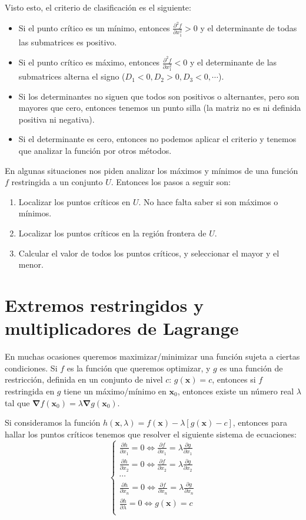 \documentclass[a4paper]{article}
\begin{document}
Visto esto, el criterio de clasificación es el siguiente:
\begin{itemize}
	\item Si el punto crítico es un mínimo, entonces $\frac{\partial^2 f}{\partial x_1^2} > 0$ y el determinante de todas las submatrices es positivo.
	\item Si el punto crítico es máximo, entonces $\frac{\partial^2 f}{\partial x_1^2} < 0$ y el determinante de las submatrices alterna el signo ($D_1 <0, D_2>0, D_3<0, \cdots$).
	\item Si los determinantes no siguen que todos son positivos o alternantes, pero son mayores que cero, entonces tenemos un punto silla (la matriz no es ni definida positiva ni negativa).
	\item Si el determinante es cero, entonces no podemos aplicar el criterio y tenemos que analizar la función por otros métodos.
\end{itemize}


En algunas situaciones nos piden analizar los máximos y mínimos de una función $f$ restringida a un conjunto $U$. Entonces los pasos a seguir son:
\begin{enumerate}
	\item Localizar los puntos críticos en $U$. No hace falta saber si son máximos o mínimos.
	\item Localizar los puntos críticos en la región frontera de $U$.
	\item Calcular el valor de todos los puntos críticos, y seleccionar el mayor y el menor.
\end{enumerate}


\section{Extremos restringidos y multiplicadores de Lagrange}
En muchas ocasiones queremos maximizar/minimizar una función sujeta a ciertas condiciones. Si $f$ es la función que queremos optimizar, y $g$ es una función de restricción, definida en un conjunto de nivel $c$: $g(\textbf{x})  = c$, entonces si $f$ restringida en $g$ tiene un máximo/mínimo en $\textbf{x}_0$, entonces existe un número real $\lambda$ tal que $\boldsymbol{\nabla}f(\textbf{x}_0) = \lambda\boldsymbol{\nabla}g(\textbf{x}_0)$.

Si consideramos la función $h(\textbf{x},\lambda) = f(\textbf{x})- \lambda[g(\textbf{x})-c]$, entonces para hallar los puntos críticos tenemos que resolver el siguiente sistema de ecuaciones:
\[\begin{cases} 
\frac{\partial h}{\partial x_1} = 0 \iff \frac{\partial f}{\partial x_1} = \lambda \frac{\partial g}{\partial x_1}  \\ 
\frac{\partial h}{\partial x_2} = 0 \iff \frac{\partial f}{\partial x_2} = \lambda \frac{\partial g}{\partial x_2}  \\ 
\cdots\\
\frac{\partial h}{\partial x_n} = 0 \iff \frac{\partial f}{\partial x_n} = \lambda \frac{\partial g}{\partial x_n}  \\ 
\frac{\partial h}{\partial \lambda} = 0 \iff g(\textbf{x}) = c  \\ 
\end{cases}\]
\end{document}
